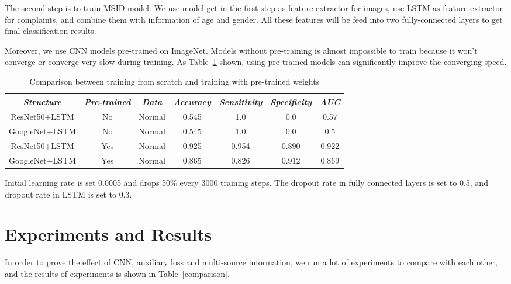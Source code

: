 \documentclass[runningheads]{llncs}
\begin{document}
The second step is to train MSID model. We use model get in the first step as feature extractor for images, use LSTM as feature extractor for complaints, and combine them with information of age and gender. All these features will be feed into two fully-connected layers to get final classification results.

Moreover, we use CNN models pre-trained on ImageNet\cite{ILSVRC15}. Models without pre-training is almost impossible to train because it won't converge or converge very slow during training. As Table~\ref{pretrain} shown, using pre-trained models can significantly improve the converging speed.

\begin{table}[htb]
    \vspace{-0cm}
    \caption{Comparison between training from scratch and training with pre-trained weights}
    \vspace{-0cm}
    \begin{center}
    \begin{tabular}{|c|c|c|c|c|c|c|}
    \hline
    \textbf{\textit{Structure}} & \textbf{\textit{Pre-trained}} & \textbf{\textit{Data}}& \textbf{\textit{Accuracy}}  & \textbf{\textit{Sensitivity}} & \textbf{\textit{Specificity}} & \textbf{\textit{AUC}}\\
    \hline
    ResNet50+LSTM &No & Normal & 0.545 & 1.0 &0.0 &0.57 \\
    GoogleNet+LSTM & No & Normal & 0.545 & 1.0 & 0.0 &0.5\\
    ResNet50+LSTM & Yes & Normal & 0.925 & 0.954 & 0.890 & 0.922\\
    GoogleNet+LSTM & Yes & Normal & 0.865 & 0.826 & 0.912 & 0.869\\
    
    \hline
    \end{tabular}
    \vspace{-0.5cm}
    \label{pretrain}
    \end{center}
    \vspace{-0.5cm}
    \end{table}

Initial learning rate is set 0.0005 and drops 50\% every 3000 training steps. The dropout rate in fully connected layers is set to 0.5, and dropout rate in LSTM is set to 0.3.

\section{Experiments and Results}
\label{exp}
In order to prove the effect of CNN, auxiliary loss and multi-source information, we run a lot of experiments to compare with each other, and the results of experiments is shown in Table~\ref{comparison}.
\end{document}
